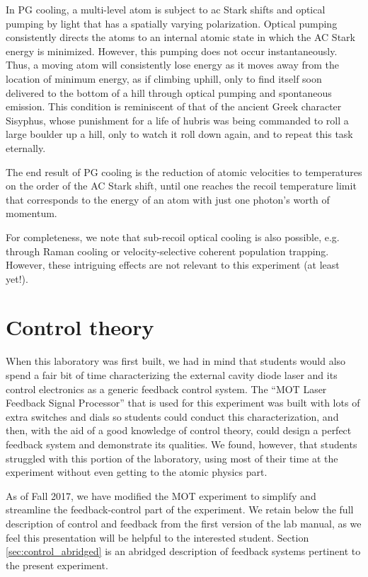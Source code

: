 \documentclass{../lab}
\begin{document}
In PG cooling, a multi-level atom is subject to ac Stark shifts and optical pumping by light that has a spatially varying polarization. Optical pumping consistently directs the atoms to an internal atomic state in which the AC Stark energy is minimized. However, this pumping does not occur instantaneously. Thus, a moving atom will consistently lose energy as it moves away from the location of minimum energy, as if climbing uphill, only to find itself soon delivered to the bottom of a hill through optical pumping and spontaneous emission. This condition is reminiscent of that of the ancient Greek character Sisyphus, whose punishment for a life of hubris was being commanded to roll a large boulder up a hill, only to watch it roll down again, and to repeat this task eternally.

The end result of PG cooling is the reduction of atomic velocities to temperatures on the order of the AC Stark shift, until one reaches the recoil temperature limit that corresponds to the energy of an atom with just one photon's worth of momentum.

For completeness, we note that sub-recoil optical cooling is also possible, e.g. through Raman cooling or velocity-selective coherent population trapping. However, these intriguing effects are not relevant to this experiment (at least yet!).


\section{Control theory}
\label{sec:controlappendix}

When this laboratory was first built, we had in mind that students would also spend a fair bit of time characterizing the external cavity diode laser and its control electronics as a generic feedback control system.  The ``MOT Laser Feedback Signal Processor'' that is used for this experiment was built with lots of extra switches and dials so students could conduct this characterization, and then, with the aid of a good knowledge of control theory, could design a perfect feedback system and demonstrate its qualities.  We found, however, that students struggled with this portion of the laboratory, using most of their time at the experiment without even getting to the atomic physics part.

As of Fall 2017, we have modified the MOT experiment to simplify and streamline the feedback-control part of the experiment.  We retain below the full description of control and feedback from the first version of the lab manual, as we feel this presentation will be helpful to the interested student.  Section \ref{sec:control_abridged} is an abridged description of feedback systems pertinent to the present experiment.
\end{document}
